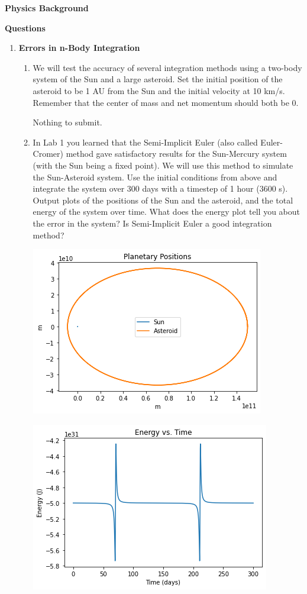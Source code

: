 \documentclass{article}
\begin{document}
{\Large \textbf{Physics Background}}

{\Large \textbf{Questions}}

\begin{enumerate}
	\item \textbf{Errors in n-Body Integration}
	
	\begin{enumerate}
		\item We will test the accuracy of several integration methods using a two-body system of the Sun and a large asteroid. Set the initial position of the asteroid to be 1 AU from the Sun and the initial velocity at 10 km/s. Remember that the center of mass and net momentum should both be 0.
		
		Nothing to submit.
		
		\item In Lab 1 you learned that the Semi-Implicit Euler (also called Euler-Cromer) method gave satisfactory results for the Sun-Mercury system (with the Sun being a fixed point). We will use this method to simulate the Sun-Asteroid system. Use the initial conditions from above and integrate the system over 300 days with a timestep of 1 hour (3600 s). Output plots of the positions of the Sun and the asteroid, and the total energy of the system over time. What does the energy plot tell you about the error in the system? Is Semi-Implicit Euler a good integration method?
		
		\includegraphics[scale = 0.8]{q1b_1.png}
		
		\includegraphics[scale = 0.8]{q1b_2.png}
		

\end{enumerate}
\end{enumerate}
\end{document}
